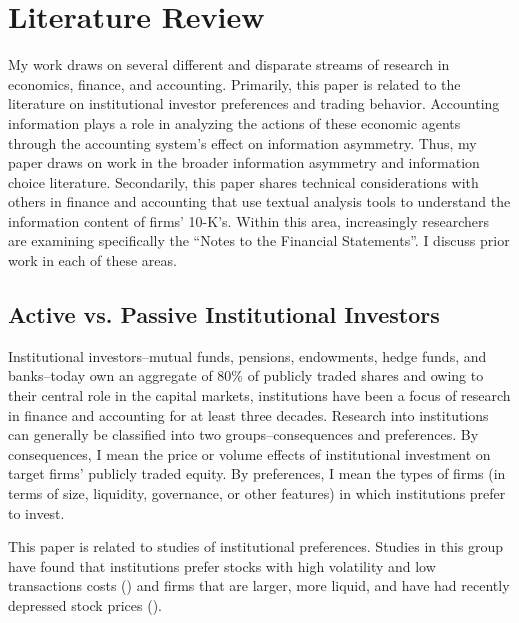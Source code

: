 \documentclass[thesis]{thesis-umich}
\begin{document}
\chapter{Literature Review}\label{chap:lit-review} 
My work draws on several different and disparate streams of research in economics, finance, and accounting. Primarily, this paper is related to the literature on institutional investor preferences and trading behavior. Accounting information plays a role in analyzing the actions of these economic agents through the accounting system's effect on information asymmetry. Thus, my paper draws on work in the broader information asymmetry and information choice literature. Secondarily, this paper shares technical considerations with others in finance and accounting that use textual analysis tools to understand the information content of firms' 10-K's. Within this area, increasingly researchers are examining specifically the ``Notes to the Financial Statements''. I discuss prior work in each of these areas.

\section{Active vs. Passive Institutional Investors} \label{sec:avp}
Institutional investors--mutual funds, pensions, endowments, hedge funds, and banks--today own an aggregate of 80\% of publicly traded shares and owing to their central role in the capital markets, institutions have been a focus of research in finance and accounting for at least three decades. Research into institutions can generally be classified into two groups--consequences and preferences. By consequences, I mean the price or volume effects of institutional investment on target firms' publicly traded equity. By preferences, I mean the types of firms (in terms of size, liquidity, governance, or other features) in which institutions prefer to invest. 

This paper is related to studies of institutional preferences.
Studies in this group have found that institutions prefer stocks with high volatility and low transactions costs (\cite{falkenstein1996}) and firms that are larger, more liquid, and have had recently depressed stock prices (\cite{gompersmetrick2001}). 
\end{document}
